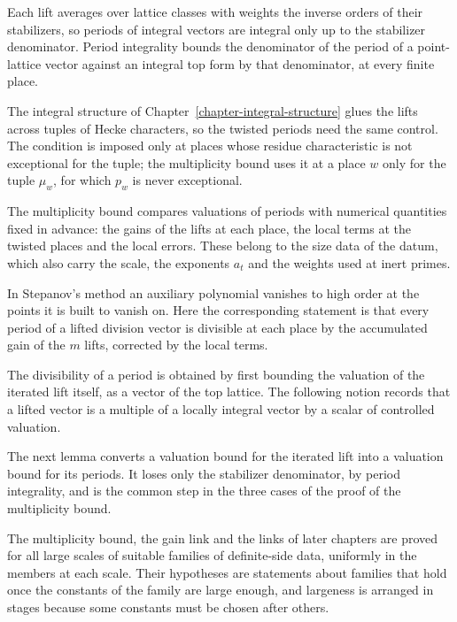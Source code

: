 Each lift averages over lattice classes with weights the inverse orders of their stabilizers, so
periods of integral vectors are integral only up to the stabilizer denominator. Period
integrality bounds the denominator of the period of a point-lattice vector against an integral top
form by that denominator, at every finite place.

The integral structure of Chapter~\ref{chapter-integral-structure} glues the lifts across tuples
of Hecke characters, so the twisted periods need the same control. The condition is imposed only
at places whose residue characteristic is not exceptional for the tuple; the multiplicity bound
uses it at a place $w$ only for the tuple $\mu_w$, for which $p_w$ is never exceptional.

The multiplicity bound compares valuations of periods with numerical quantities fixed in advance:
the gains of the lifts at each place, the local terms at the twisted places and the local errors.
These belong to the size data of the datum, which also carry the scale, the exponents $a_t$ and the
weights used at inert primes.

In Stepanov's method an auxiliary polynomial vanishes to high order at the points it is built to
vanish on. Here the corresponding statement is that every period of a lifted division vector is
divisible at each place by the accumulated gain of the $m$ lifts, corrected by the local terms.

The divisibility of a period is obtained by first bounding the valuation of the iterated lift
itself, as a vector of the top lattice. The following notion records that a lifted vector is a
multiple of a locally integral vector by a scalar of controlled valuation.

The next lemma converts a valuation bound for the iterated lift into a valuation bound for its
periods. It loses only the stabilizer denominator, by period integrality, and is the common step in
the three cases of the proof of the multiplicity bound.

The multiplicity bound, the gain link and the links of later chapters are proved for all large
scales of suitable families of definite-side data, uniformly in the members at each scale. Their
hypotheses are statements about families that hold once the constants of the family are large
enough, and largeness is arranged in stages because some constants must be chosen after others.

